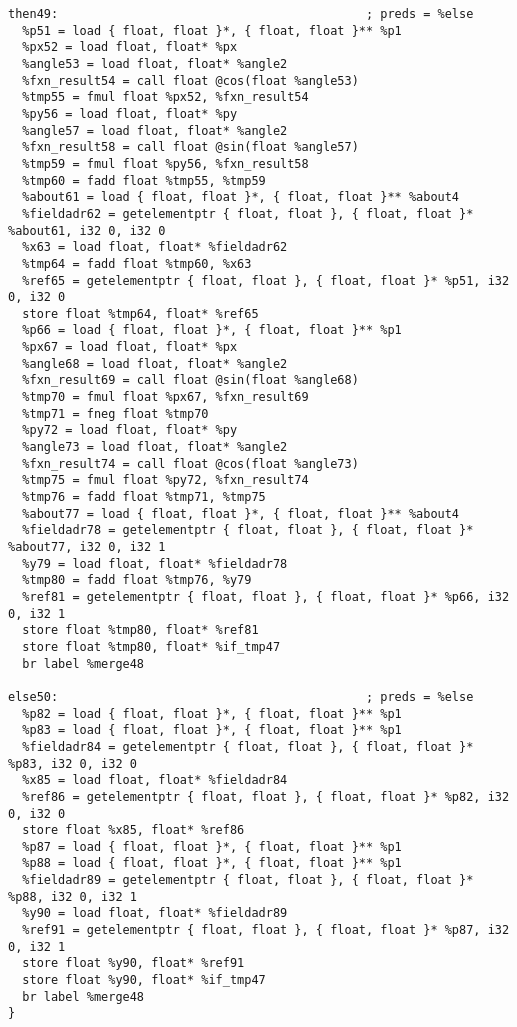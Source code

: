 \documentclass[main.tex]{subfiles}
\begin{document}
{\begin{lstlisting}
then49:                                           ; preds = %else
  %p51 = load { float, float }*, { float, float }** %p1
  %px52 = load float, float* %px
  %angle53 = load float, float* %angle2
  %fxn_result54 = call float @cos(float %angle53)
  %tmp55 = fmul float %px52, %fxn_result54
  %py56 = load float, float* %py
  %angle57 = load float, float* %angle2
  %fxn_result58 = call float @sin(float %angle57)
  %tmp59 = fmul float %py56, %fxn_result58
  %tmp60 = fadd float %tmp55, %tmp59
  %about61 = load { float, float }*, { float, float }** %about4
  %fieldadr62 = getelementptr { float, float }, { float, float }* %about61, i32 0, i32 0
  %x63 = load float, float* %fieldadr62
  %tmp64 = fadd float %tmp60, %x63
  %ref65 = getelementptr { float, float }, { float, float }* %p51, i32 0, i32 0
  store float %tmp64, float* %ref65
  %p66 = load { float, float }*, { float, float }** %p1
  %px67 = load float, float* %px
  %angle68 = load float, float* %angle2
  %fxn_result69 = call float @sin(float %angle68)
  %tmp70 = fmul float %px67, %fxn_result69
  %tmp71 = fneg float %tmp70
  %py72 = load float, float* %py
  %angle73 = load float, float* %angle2
  %fxn_result74 = call float @cos(float %angle73)
  %tmp75 = fmul float %py72, %fxn_result74
  %tmp76 = fadd float %tmp71, %tmp75
  %about77 = load { float, float }*, { float, float }** %about4
  %fieldadr78 = getelementptr { float, float }, { float, float }* %about77, i32 0, i32 1
  %y79 = load float, float* %fieldadr78
  %tmp80 = fadd float %tmp76, %y79
  %ref81 = getelementptr { float, float }, { float, float }* %p66, i32 0, i32 1
  store float %tmp80, float* %ref81
  store float %tmp80, float* %if_tmp47
  br label %merge48

else50:                                           ; preds = %else
  %p82 = load { float, float }*, { float, float }** %p1
  %p83 = load { float, float }*, { float, float }** %p1
  %fieldadr84 = getelementptr { float, float }, { float, float }* %p83, i32 0, i32 0
  %x85 = load float, float* %fieldadr84
  %ref86 = getelementptr { float, float }, { float, float }* %p82, i32 0, i32 0
  store float %x85, float* %ref86
  %p87 = load { float, float }*, { float, float }** %p1
  %p88 = load { float, float }*, { float, float }** %p1
  %fieldadr89 = getelementptr { float, float }, { float, float }* %p88, i32 0, i32 1
  %y90 = load float, float* %fieldadr89
  %ref91 = getelementptr { float, float }, { float, float }* %p87, i32 0, i32 1
  store float %y90, float* %ref91
  store float %y90, float* %if_tmp47
  br label %merge48
}


\end{lstlisting}}
\end{document}
